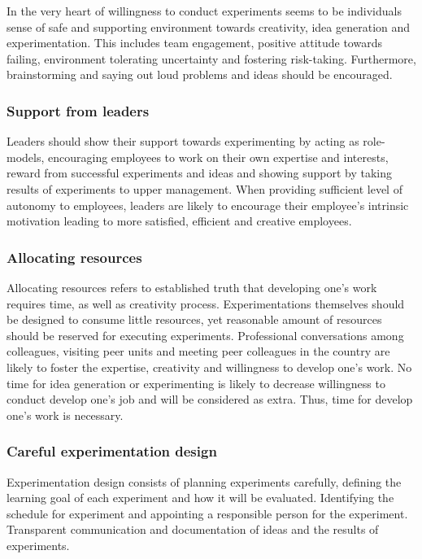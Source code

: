 In the very heart of willingness to conduct experiments seems to be individuals sense of safe and supporting environment towards creativity, idea generation and experimentation. This includes team engagement, positive attitude towards failing, environment tolerating uncertainty and fostering risk-taking. Furthermore, brainstorming and saying out loud problems and ideas should be encouraged. 

\subsubsection*{Support from leaders}
Leaders should show their support towards experimenting by acting as role-models, encouraging employees to work on their own expertise and interests, reward from successful experiments and ideas and showing support by taking results of experiments to upper management. When providing sufficient level of autonomy to employees, leaders are likely to encourage their employee's intrinsic motivation leading to more satisfied, efficient and creative employees. 

\subsubsection*{Allocating resources}
Allocating resources refers to established truth that developing one's work requires time, as well as creativity process. Experimentations themselves should be designed to consume little resources, yet reasonable amount of resources should be reserved for executing experiments. Professional conversations among colleagues, visiting peer units and meeting peer colleagues in the country are likely to foster the expertise, creativity and willingness to develop one's work. No time for idea generation or experimenting is likely to decrease willingness to conduct develop one's job and will be considered as extra. Thus, time for develop one's work is necessary. 

\subsubsection*{Careful experimentation design}
Experimentation design consists of planning experiments carefully, defining the learning goal of each experiment and how it will be evaluated. Identifying the schedule for experiment and appointing a responsible person for the experiment. Transparent communication and documentation of ideas and the results of experiments. 


